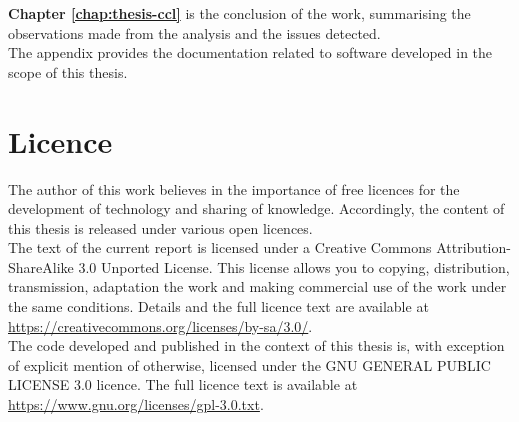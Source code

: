 \textbf{Chapter \ref{chap:thesis-ccl}} is the conclusion of the work, summarising the observations made from the analysis and the issues detected.\\

The appendix provides the documentation related to software developed in the scope of this thesis.

\section*{Licence}

The author of this work believes in the importance of free licences for the development of technology and sharing of knowledge.
Accordingly, the content of this thesis is released under various open licences.\\

The text of the current report is licensed under a Creative Commons Attribution-ShareAlike 3.0 Unported License.
This license allows you to copying, distribution, transmission, adaptation the work and making commercial use of the work under the same conditions.
Details and the full licence text are available at \url{https://creativecommons.org/licenses/by-sa/3.0/}.\\

The code developed and published in the context of this thesis is, with exception of explicit mention of otherwise, licensed under the GNU GENERAL PUBLIC LICENSE 3.0 licence. The full licence text is available at \url{https://www.gnu.org/licenses/gpl-3.0.txt}.


